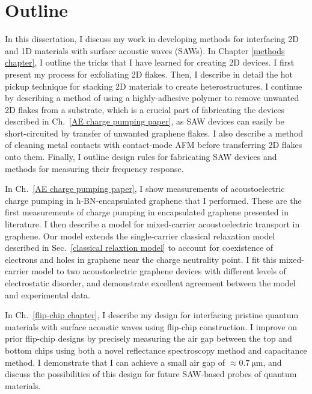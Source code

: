 \documentclass{beavtex_dub_edit}
\begin{document}
\section{Outline}
In this dissertation, I discuss my work in developing methods for interfacing 2D and 1D materials with surface acoustic waves (SAWs). In Chapter \ref{methods chapter}, I outline the tricks that I have learned for creating 2D devices. I first present my process for exfoliating 2D flakes. Then, I describe in detail the hot pickup technique for stacking 2D materials to create heterostructures. I continue by describing a method of using a highly-adhesive polymer to remove unwanted 2D flakes from a substrate, which is a crucial part of fabricating the devices described in Ch.\ \ref{AE charge pumping paper}, as SAW devices can easily be short-circuited by transfer of unwanted graphene flakes. I also describe a method of cleaning metal contacts with contact-mode AFM before transferring 2D flakes onto them. Finally, I outline design rules for fabricating SAW devices and methods for measuring their frequency response. 

In Ch.\ \ref{AE charge pumping paper}, I show measurements of acoustoelectric charge pumping in h-BN-encapsulated graphene that I performed. These are the first measurements of charge pumping in encapsulated graphene presented in literature. I then describe a model for mixed-carrier acoustoelectric transport in graphene. Our model extends the single-carrier classical relaxation model described in Sec.\ \ref{classical relaxtion model} to account for coexistence of electrons and holes in graphene near the charge neutrality point. I fit this mixed-carrier model to two acoustoelectric graphene devices with different levels of electrostatic disorder, and demonstrate excellent agreement between the model and experimental data.

In Ch.\ \ref{flip-chip chapter}, I describe my design for interfacing pristine quantum materials with surface acoustic waves using flip-chip construction. I improve on prior flip-chip designs by precisely measuring the air gap between the top and bottom chips using both a novel reflectance spectroscopy method and capacitance method. I demonstrate that I can achieve a small air gap of $\approx \SI{0.7}{\micro\meter}$, and discuss the possibilities of this design for future SAW-based probes of quantum materials.


\end{document}
